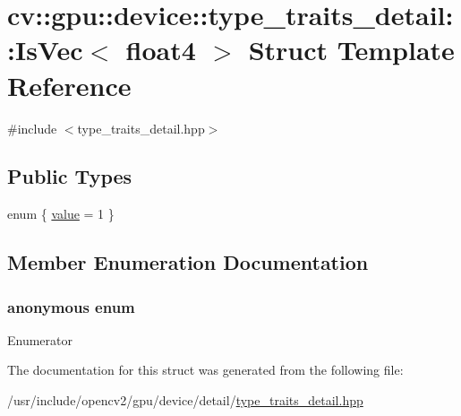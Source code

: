 \hypertarget{structcv_1_1gpu_1_1device_1_1type__traits__detail_1_1IsVec_3_01float4_01_4}{\section{cv\-:\-:gpu\-:\-:device\-:\-:type\-\_\-traits\-\_\-detail\-:\-:Is\-Vec$<$ float4 $>$ Struct Template Reference}
\label{structcv_1_1gpu_1_1device_1_1type__traits__detail_1_1IsVec_3_01float4_01_4}
}


{\ttfamily \#include $<$type\-\_\-traits\-\_\-detail.\-hpp$>$}

\subsection*{Public Types}
\begin{DoxyCompactItemize}
\item 
enum \{ \hyperlink{structcv_1_1gpu_1_1device_1_1type__traits__detail_1_1IsVec_3_01float4_01_4_a9183302268ec458c1e76b109dff3f45aaa9645207694c635ceccf300595dc6827}{value} = 1
 \}
\end{DoxyCompactItemize}


\subsection{Member Enumeration Documentation}
\hypertarget{structcv_1_1gpu_1_1device_1_1type__traits__detail_1_1IsVec_3_01float4_01_4_a9183302268ec458c1e76b109dff3f45a}{\subsubsection[{anonymous enum}]{\setlength{\rightskip}{0pt plus 5cm}anonymous enum}}\label{structcv_1_1gpu_1_1device_1_1type__traits__detail_1_1IsVec_3_01float4_01_4_a9183302268ec458c1e76b109dff3f45a}
\begin{Desc}
\item[Enumerator]\par
\begin{description}
\item[{\em 
\hypertarget{structcv_1_1gpu_1_1device_1_1type__traits__detail_1_1IsVec_3_01float4_01_4_a9183302268ec458c1e76b109dff3f45aaa9645207694c635ceccf300595dc6827}{value}\label{structcv_1_1gpu_1_1device_1_1type__traits__detail_1_1IsVec_3_01float4_01_4_a9183302268ec458c1e76b109dff3f45aaa9645207694c635ceccf300595dc6827}
}]\end{description}
\end{Desc}


The documentation for this struct was generated from the following file\-:\begin{DoxyCompactItemize}
\item 
/usr/include/opencv2/gpu/device/detail/\hyperlink{type__traits__detail_8hpp}{type\-\_\-traits\-\_\-detail.\-hpp}\end{DoxyCompactItemize}
